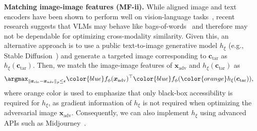 \textbf{Matching image-image features (MF-ii).} While aligned image and text encoders have been shown to perform well on vision-language tasks~\citep{radford2021learning}, recent research suggests that VLMs may behave like bags-of-words~\citep{yuksekgonul2023when} and therefore may not be dependable for optimizing cross-modality similarity. Given this, an alternative approach is to use a public text-to-image generative model $h_{\xi}$ (e.g., Stable Diffusion~\citep{rombach2022high}) and generate a targeted image corresponding to $\boldsymbol{c}_{\text{tar}}$ as $h_{\xi}(\boldsymbol{c}_{\text{tar}})$. Then, we match the image-image features of $\boldsymbol{x}_{\text{adv}}$ and $h_{\xi}(\boldsymbol{c}_{\text{tar}})$ as
\begin{equation}
    \argmax_{\|\boldsymbol{x}_{\text{cle}}-\boldsymbol{x}_{\text{adv}}\|_{p}\leq \epsilon} {\color{blue}f_{\phi}}(\boldsymbol{x}_{\text{adv}})^{\top}{\color{blue}f_{\phi}}({\color{orange}h_{\xi}}(\boldsymbol{c}_{\text{tar}}))\textrm{,}
    \label{equ2}
\end{equation}
where {\color{orange}orange} color is used to emphasize that only black-box accessibility is required for $h_{\xi}$, as gradient information of $h_{\xi}$ is not required when optimizing the adversarial image $\boldsymbol{x}_{\text{adv}}$. 
Consequently, we can also implement $h_{\xi}$ using advanced APIs such as Midjourney~\citep{Midjourney}.

